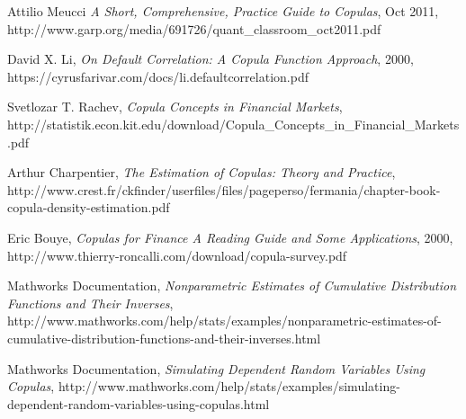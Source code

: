 \documentclass[titlepage]{article}
\begin{document}
\newpage
\begin{thebibliography}{1}
	
	 Attilio Meucci {\em A Short, Comprehensive, Practice Guide to Copulas},  Oct 2011, http://www.garp.org/media/691726/quant\_classroom\_oct2011.pdf
	
	  David X. Li, {\em On Default Correlation: A Copula Function Approach}, 2000, https://cyrusfarivar.com/docs/li.defaultcorrelation.pdf
	
	 Svetlozar T. Rachev, {\em Copula Concepts in Financial Markets}, 
	http://statistik.econ.kit.edu/download/Copula\_Concepts\_in\_Financial\_Markets.pdf
	
	 Arthur Charpentier, {\em The Estimation of Copulas: Theory and Practice}, http://www.crest.fr/ckfinder/userfiles/files/pageperso/fermania/chapter-book-copula-density-estimation.pdf
	
	 Eric Bouye, {\em Copulas for Finance A Reading Guide and Some Applications}, 2000, http://www.thierry-roncalli.com/download/copula-survey.pdf
	
	 Mathworks Documentation, {\em Nonparametric Estimates of Cumulative Distribution Functions and Their Inverses}, http://www.mathworks.com/help/stats/examples/nonparametric-estimates-of-cumulative-distribution-functions-and-their-inverses.html
	
	 Mathworks Documentation, {\em Simulating Dependent Random Variables Using Copulas}, http://www.mathworks.com/help/stats/examples/simulating-dependent-random-variables-using-copulas.html
	
	
\end{thebibliography}
\end{document}
